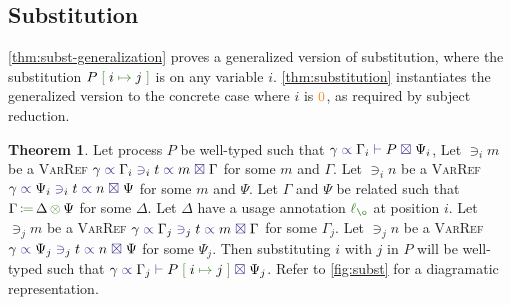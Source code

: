 \documentclass[a4paper,UKenglish,cleveref,autoref,thm-restate,authorcolumns]{lipics-v2019}
\theoremstyle{definition}
\newtheorem{nitheorem}[theorem]{Theorem}
\newcommand{\type}[1]{\textcolor{BlueViolet}{\operatorname{#1}}}
\newcommand{\constr}[1]{\textcolor{BurntOrange}{\operatorname{#1}}}
\newcommand{\func}[1]{\textcolor{OliveGreen}{\operatorname{#1}}}
\newcommand{\subst}[3]{#1 \; \func{[} \; #3 \; \func{\mapsto} \;#2 \; \func{]}}
\newcommand{\opctx}[3]{#1 \, \func{\coloneqq} \, #2 \, \func{\otimes} \, #3}
\newcommand{\lz}{\func{\ell_{\o}}}
\newcommand{\types}[4]{#1 \; \type{\propto} \; #2 \; \type{\vdash} \; #3 \; \type{\boxtimes} \; #4}
\newcommand{\contains}[6]{#1 \; \type{\propto} \; #2 \; \type{\ni}_{#3} \; #4 \; \type{\propto} \; #5 \; \type{\boxtimes} \; #6}
\begin{document}
\subsection{Substitution}
\label{substitution}

\autoref{thm:subst-generalization} proves a generalized version of substitution, where the substitution $\subst{P}{j}{i}$ is on any variable $i$.
\autoref{thm:substitution} instantiates the generalized version to the concrete case where $i$ is $\constr{0}$, as required by subject reduction.

\begin{nitheorem}
  \label{thm:subst-generalization}
  Let process $P$ be well-typed such that $\types{\gamma}{\Gamma_i}{P}{\Psi_i}$,
  Let $\ni_i m$ be a \textsc{VarRef} $\contains{\gamma}{\Gamma_i}{i}{t}{m}{\Gamma}$ for some $m$ and $\Gamma$.
  Let $\ni_i n$ be a \textsc{VarRef} $\contains{\gamma}{\Psi_i}{i}{t}{n}{\Psi}$ for some $m$ and $\Psi$.
  Let $\Gamma$ and $\Psi$ be related such that $\opctx{\Gamma}{\Delta}{\Psi}$ for some $\Delta$.
  Let $\Delta$ have a usage annotation $\lz$ at position $i$.
  Let $\ni_j m$ be a \textsc{VarRef} $\contains{\gamma}{\Gamma_j}{j}{t}{m}{\Gamma}$ for some $\Gamma_j$.
  Let $\ni_j n$ be a \textsc{VarRef} $\contains{\gamma}{\Psi_j}{j}{t}{n}{\Psi}$ for some $\Psi_j$.
  Then substituting $i$ with $j$ in $P$ will be well-typed such that $\types{\gamma}{\Gamma_j}{\subst{P}{j}{i}}{\Psi_j}$.
  Refer to \autoref{fig:subst} for a diagramatic representation.
\end{nitheorem}
\end{document}
